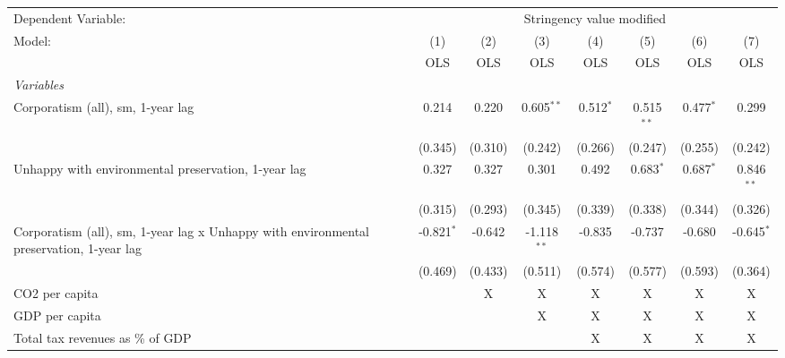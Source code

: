 
\begingroup
\centering
\begin{tabular}{lccccccc}
   \toprule
   Dependent Variable: & \multicolumn{7}{c}{Stringency value modified}\\
   Model:                                                                                  & (1)          & (2)     & (3)           & (4)         & (5)          & (6)         & (7)\\  
                                                                                           &  OLS         & OLS     & OLS           & OLS         & OLS          & OLS         & OLS\\  
   \midrule
   \emph{Variables}\\
   Corporatism (all), sm, 1-year lag                                                       & 0.214        & 0.220   & 0.605$^{**}$  & 0.512$^{*}$ & 0.515$^{**}$ & 0.477$^{*}$ & 0.299\\   
                                                                                           & (0.345)      & (0.310) & (0.242)       & (0.266)     & (0.247)      & (0.255)     & (0.242)\\   
   Unhappy with environmental preservation, 1-year lag                                     & 0.327        & 0.327   & 0.301         & 0.492       & 0.683$^{*}$  & 0.687$^{*}$ & 0.846$^{**}$\\   
                                                                                           & (0.315)      & (0.293) & (0.345)       & (0.339)     & (0.338)      & (0.344)     & (0.326)\\   
   Corporatism (all), sm, 1-year lag x Unhappy with environmental preservation, 1-year lag & -0.821$^{*}$ & -0.642  & -1.118$^{**}$ & -0.835      & -0.737       & -0.680      & -0.645$^{*}$\\   
                                                                                           & (0.469)      & (0.433) & (0.511)       & (0.574)     & (0.577)      & (0.593)     & (0.364)\\   
   CO2 per capita                                                                          &              & X       & X             & X           & X            & X           & X\\  
   GDP per capita                                                                          &              &         & X             & X           & X            & X           & X\\  
   Total tax revenues as \% of GDP                                                         &              &         &               & X           & X            & X           & X\\  

\end{tabular}

